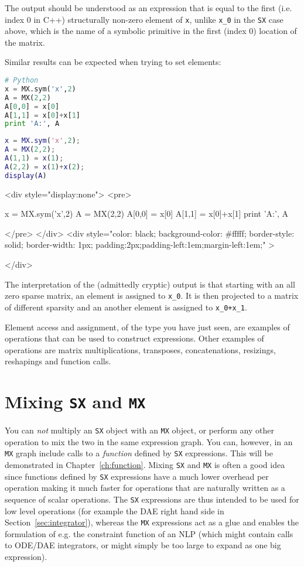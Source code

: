 \documentclass[a4paper,12pt]{book}
\newcounter{pytexcount}
\newcounter{pytexsubcount}
\renewenvironment{pytexoutput}
{\addtocounter{pytexsubcount}{1}%
\begin{rawhtml}
<div style="display:none">
<pre>
\end{rawhtml}
}%
{\begin{rawhtml}
</pre>
</div>
<div style="color: black; background-color: \#fffff;  border-style: solid; border-width: 1px; padding:2px;padding-left:1em;margin-left:1em;" >\end{rawhtml}%
\verbatiminputeval{pytex_\alph{pytexcount}_\arabic{pytexsubcount}.log}%
\begin{rawhtml}
</div>
\end{rawhtml}
}
\begin{document}
The output should be understood as an expression that is equal to the first (i.e. index 0 in C++) structurally non-zero element of \texttt{x}, unlike \texttt{x\_0} in the \texttt{SX} case above, which is the name of a symbolic primitive in the first (index 0) location of the matrix.

Similar results can be expected when trying to set elements:

\begin{minipage}[t]{0.5\textwidth}
\begin{lstlisting}[language=Python]
# Python
x = MX.sym('x',2)
A = MX(2,2)
A[0,0] = x[0]
A[1,1] = x[0]+x[1]
print 'A:', A
\end{lstlisting}
\end{minipage}
\begin{minipage}[t]{0.5\textwidth}
\begin{lstlisting}[language=Matlab]
% MATLAB
x = MX.sym('x',2);
A = MX(2,2);
A(1,1) = x(1);
A(2,2) = x(1)+x(2);
display(A)
\end{lstlisting}
\end{minipage}

\begin{pytexoutput}
x = MX.sym('x',2)
A = MX(2,2)
A[0,0] = x[0]
A[1,1] = x[0]+x[1]
print 'A:', A
\end{pytexoutput}

The interpretation of the (admittedly cryptic) output is that starting with an all zero sparse matrix, an element is assigned to \texttt{x\_0}. It is then projected to a matrix of different sparsity and an another element is assigned to \texttt{x\_0+x\_1}.

Element access and assignment, of the type you have just seen, are examples of operations that can be used to construct expressions. Other examples of operations are matrix multiplications, transposes, concatenations, resizings, reshapings and function calls.

\section{Mixing \texttt{SX} and \texttt{MX}}
You can \emph{not} multiply an \texttt{SX} object with an \texttt{MX} object, or perform any other operation to mix the two in the same expression graph. You can, however, in an \texttt{MX} graph include calls to a \emph{function} defined by \texttt{SX} expressions. This will be demonstrated in Chapter~\ref{ch:function}. Mixing \texttt{SX} and \texttt{MX} is often a good idea since functions defined by \texttt{SX} expressions have a much lower overhead per operation making it much faster for operations that are naturally written as a sequence of scalar operations. The \texttt{SX} expressions are thus intended to be used for low level operations (for example the DAE right hand side in Section~\ref{sec:integrator}), whereas the \texttt{MX} expressions act as a glue and enables the formulation of e.g. the constraint function of an NLP (which might contain calls to ODE/DAE integrators, or might simply be too large to expand as one big expression).
\end{document}
